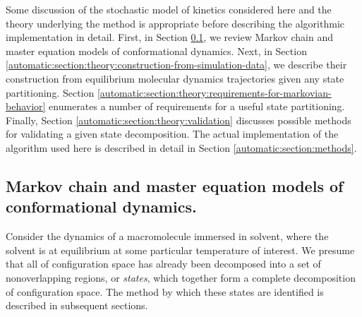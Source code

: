 
Some discussion of the stochastic model of kinetics considered here and the theory underlying the method is appropriate before describing the algorithmic implementation in detail.
First, in Section \ref{automatic:section:theory:markov-model-introduction}, we review Markov chain and master equation models of conformational dynamics.
Next, in Section \ref{automatic:section:theory:construction-from-simulation-data}, we describe their construction from equilibrium molecular dynamics trajectories given any state partitioning.
Section \ref{automatic:section:theory:requirements-for-markovian-behavior} enumerates a number of requirements for a useful state partitioning.
Finally, Section \ref{automatic:section:theory:validation} discusses possible methods for validating a given state decomposition.
The actual implementation of the algorithm used here is described in detail in Section \ref{automatic:section:methods}.

\subsection{Markov chain and master equation models of conformational dynamics.}
\label{automatic:section:theory:markov-model-introduction}

Consider the dynamics of a macromolecule immersed in solvent, where the solvent is at equilibrium at some particular temperature of interest.
We presume that all of configuration space has already been decomposed into a set of nonoverlapping regions, or \emph{states}, which together form a complete decomposition of configuration space.
The method by which these states are identified is described in subsequent sections.


